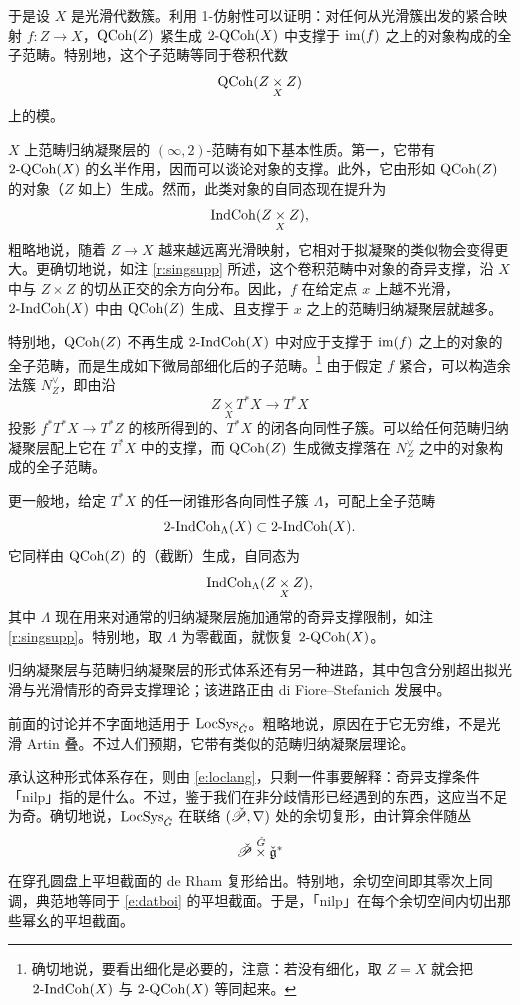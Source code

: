 于是设 $X$ 是光滑代数簇。利用 1-仿射性可以证明：对任何从光滑簇出发的紧合映射 $f: Z \rightarrow X$，$\operatorname{QCoh}(Z)$ 紧生成 $\operatorname{2-QCoh}(X)$ 中支撑于 $\operatorname{im}(f)$ 之上的对象构成的全子范畴。特别地，这个子范畴等同于卷积代数
\[
  \operatorname{QCoh}(Z \underset X \times Z)
\]
上的模。

$X$ 上范畴归纳凝聚层的 $(\infty,2)$-范畴有如下基本性质。第一，它带有 $\operatorname{2-QCoh}(X)$ 的幺半作用，因而可以谈论对象的支撑。此外，它由形如 $\operatorname{QCoh}(Z)$ 的对象（$Z$ 如上）生成。然而，此类对象的自同态现在提升为
\[
   \operatorname{IndCoh}( Z \underset{X}{\times} Z),
\]
粗略地说，随着 $Z \rightarrow X$ 越来越远离光滑映射，它相对于拟凝聚的类似物会变得更大。更确切地说，如注 \ref{r:singsupp} 所述，这个卷积范畴中对象的奇异支撑，沿 $X$ 中与 $Z \times Z$ 的切丛正交的余方向分布。因此，$f$ 在给定点 $x$ 上越不光滑，$\operatorname{2-IndCoh}(X)$ 中由 $\operatorname{QCoh}(Z)$ 生成、且支撑于 $x$ 之上的范畴归纳凝聚层就越多。

特别地，$\operatorname{QCoh}(Z)$ 不再生成 $\operatorname{2-IndCoh}(X)$ 中对应于支撑于 $\operatorname{im}(f)$ 之上的对象的全子范畴，而是生成如下微局部细化后的子范畴。\footnote{确切地说，要看出细化是必要的，注意：若没有细化，取 $Z = X$ 就会把 $\operatorname{2-IndCoh}(X)$ 与 $\operatorname{2-QCoh}(X)$ 等同起来。} 由于假定 $f$ 紧合，可以构造余法簇 $N^\vee_{Z}$，即由沿 $$Z \underset X \times T^*X \rightarrow T^*X$$ 投影 $f^* T^*X \rightarrow T^*Z$ 的核所得到的、$T^*X$ 的闭各向同性子簇。可以给任何范畴归纳凝聚层配上它在 $T^*X$ 中的支撑，而 $\operatorname{QCoh}(Z)$ 生成微支撑落在 $N^\vee_Z$ 之中的对象构成的全子范畴。

更一般地，给定 $T^*X$ 的任一闭锥形各向同性子簇 $\Lambda$，可配上全子范畴
$$
\operatorname{2-IndCoh}_\Lambda(X) \subset \operatorname{2-IndCoh}(X).
$$
它同样由 $\operatorname{QCoh}(Z)$ 的（截断）生成，自同态为 $$\operatorname{IndCoh}_\Lambda(Z \underset X \times Z),$$ 其中 $\Lambda$ 现在用来对通常的归纳凝聚层施加通常的奇异支撑限制，如注 \ref{r:singsupp}。特别地，取 $\Lambda$ 为零截面，就恢复 $\operatorname{2-QCoh}(X)$。

\begin{re} 归纳凝聚层与范畴归纳凝聚层的形式体系还有另一种进路，其中包含分别超出拟光滑与光滑情形的奇异支撑理论；该进路正由 di Fiore--Stefanich 发展中。\end{re}

\ssszh 前面的讨论并不字面地适用于 $\operatorname{LocSys}_{\check{G}}$。粗略地说，原因在于它无穷维，不是光滑 Artin 叠。不过人们预期，它带有类似的范畴归纳凝聚层理论。

承认这种形式体系存在，则由 \eqref{e:loclang}，只剩一件事要解释：奇异支撑条件「nilp」指的是什么。不过，鉴于我们在非分歧情形已经遇到的东西，这应当不足为奇。确切地说，$\operatorname{LocSys}_{\check{G}}$ 在联络 $(\check{\mathscr{P}}, \nabla)$ 处的余切复形，由计算余伴随丛
\begin{equation} \label{e:datboi}
   \check{\mathscr{P}} \overset{\check{G}} \times \check{\mathfrak{g}}^*
\end{equation}
在穿孔圆盘上平坦截面的 de Rham 复形给出。特别地，余切空间即其零次上同调，典范地等同于 \eqref{e:datboi} 的平坦截面。于是，「nilp」在每个余切空间内切出那些幂幺的平坦截面。
